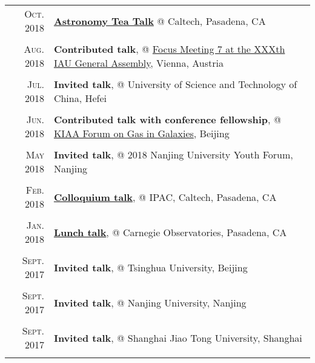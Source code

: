\documentclass[letterpaper,10pt]{article}
\newcommand{\textwrap}{5.8in}       %
\begin{document}
\begin{longtable}{r|p{\textwrap}}
    \textsc{Oct. 2018}   &   \href{http://www.astro.caltech.edu/events/tea_talks/tea_2018_2019/abstracts/wang.txt}{\textbf{Astronomy Tea Talk}} @ Caltech, Pasadena, CA \\
    \multicolumn{2}{c}{} \\

    \textsc{Aug. 2018}   &   \textbf{Contributed talk}, @ \href{http://www.arcetri.astro.it/fm7/programme.html}{Focus Meeting 7 at the XXXth IAU General Assembly}, Vienna, Austria \\
    \multicolumn{2}{c}{} \\

    \textsc{Jul. 2018}   &   \textbf{Invited talk}, @ University of Science and Technology of China, Hefei \\
    \multicolumn{2}{c}{} \\

    \textsc{Jun. 2018}   &   \textbf{Contributed talk with conference fellowship}, @ \href{http://kiaa.pku.edu.cn/gasingalaxies/?q=program}{KIAA Forum on Gas in Galaxies}, Beijing \\
    \multicolumn{2}{c}{} \\

    \textsc{May 2018}   &   \textbf{Invited talk}, @ 2018 Nanjing University Youth Forum, Nanjing \\
    \multicolumn{2}{c}{} \\

    \textsc{Feb. 2018}   &   \href{https://www.ipac.caltech.edu/event/358}{\textbf{Colloquium talk}}, @ IPAC, Caltech, Pasadena, CA \\
    \multicolumn{2}{c}{} \\

    \textsc{Jan. 2018}   &   \href{http://obs.carnegiescience.edu/talk_event/828}{\textbf{Lunch talk}}, @ Carnegie Observatories, Pasadena, CA \\
    \multicolumn{2}{c}{} \\

    \textsc{Sept. 2017}   &   \textbf{Invited talk}, @ Tsinghua University, Beijing \\
    \multicolumn{2}{c}{} \\

    \textsc{Sept. 2017}   &   \textbf{Invited talk}, @ Nanjing University, Nanjing \\
    \multicolumn{2}{c}{} \\

    \textsc{Sept. 2017}   &   \textbf{Invited talk}, @ Shanghai Jiao Tong University, Shanghai \\
    \multicolumn{2}{c}{} \\


\end{longtable}
\end{document}
